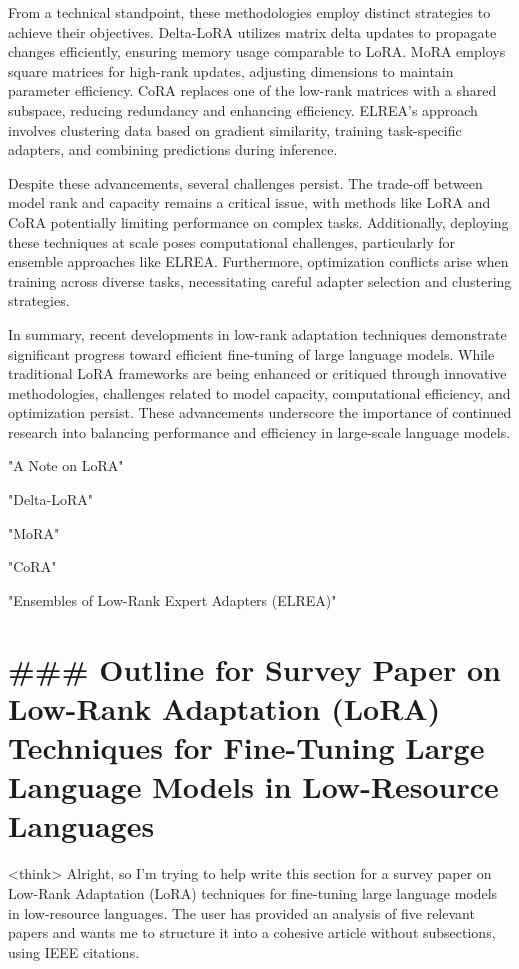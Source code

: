 \documentclass[conference]{IEEEtran}
\begin{document}
From a technical standpoint, these methodologies employ distinct strategies to achieve their objectives. Delta-LoRA utilizes matrix delta updates to propagate changes efficiently, ensuring memory usage comparable to LoRA. MoRA employs square matrices for high-rank updates, adjusting dimensions to maintain parameter efficiency. CoRA replaces one of the low-rank matrices with a shared subspace, reducing redundancy and enhancing efficiency. ELREA's approach involves clustering data based on gradient similarity, training task-specific adapters, and combining predictions during inference.

Despite these advancements, several challenges persist. The trade-off between model rank and capacity remains a critical issue, with methods like LoRA and CoRA potentially limiting performance on complex tasks. Additionally, deploying these techniques at scale poses computational challenges, particularly for ensemble approaches like ELREA. Furthermore, optimization conflicts arise when training across diverse tasks, necessitating careful adapter selection and clustering strategies.

In summary, recent developments in low-rank adaptation techniques demonstrate significant progress toward efficient fine-tuning of large language models. While traditional LoRA frameworks are being enhanced or critiqued through innovative methodologies, challenges related to model capacity, computational efficiency, and optimization persist. These advancements underscore the importance of continued research into balancing performance and efficiency in large-scale language models.

\cite{b1} "A Note on LoRA"

\cite{b2} "Delta-LoRA"

\cite{b3} "MoRA"

\cite{b4} "CoRA"

\cite{b5} "Ensembles of Low-Rank Expert Adapters (ELREA)"

\section{### Outline for Survey Paper on Low-Rank Adaptation (LoRA) Techniques for Fine-Tuning Large Language Models in Low-Resource Languages}
<think>
Alright, so I'm trying to help write this section for a survey paper on Low-Rank Adaptation (LoRA) techniques for fine-tuning large language models in low-resource languages. The user has provided an analysis of five relevant papers and wants me to structure it into a cohesive article without subsections, using IEEE citations.
\end{document}
